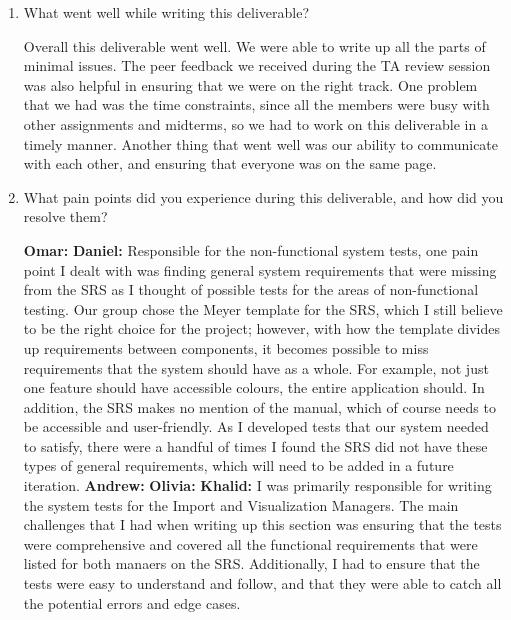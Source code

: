 \documentclass[12pt, titlepage]{article}
\begin{document}
\begin{enumerate}
  \item What went well while writing this deliverable? 

  Overall this deliverable went well. We were able to write up all the parts of minimal issues. The peer feedback we received during the TA review session was also helpful in ensuring that we were on the right track. One problem that we had was the time constraints, since all the members were busy with other assignments and midterms, so we had to work on this deliverable in a timely manner. Another thing that went well was our ability to communicate with each other, and ensuring that everyone was on the same page.

  \item What pain points did you experience during this deliverable, and how
    did you resolve them?
  

\textbf{Omar: }
\newline
\newline
\textbf{Daniel: }Responsible for the non-functional system tests, one pain point I dealt with was finding general system requirements that were missing from the SRS as I thought of possible tests for the areas of non-functional testing. Our group chose the Meyer template for the SRS, which I still believe to be the right choice for the project; however, with how the template divides up requirements between components, it becomes possible to miss requirements that the system should have as a whole. For example, not just one feature should have accessible colours, the entire application should. In addition, the SRS makes no mention of the manual, which of course needs to be accessible and user-friendly. As I developed tests that our system needed to satisfy, there were a handful of times I found the SRS did not have these types of general requirements, which will need to be added in a future iteration. 
\newline
\newline
\textbf{Andrew: } 
\newline
\newline
\textbf{Olivia: } 
\newline
\newline
\textbf{Khalid: }I was primarily responsible for writing the system tests for the Import and Visualization Managers. The main challenges that I had when writing up this section was ensuring that the tests were comprehensive and covered all the functional requirements that were listed for both manaers on the SRS. Additionally, I had to ensure that the tests were easy to understand and follow, and that they were able to catch all the potential errors and edge cases.


\end{enumerate}
\end{document}
